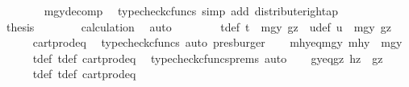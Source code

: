 \begin{isabellebody}
\ \ \ \ \ \ \isamarkupfalse%
\ mgy{\isacharunderscore}{\kern0pt}decomp\ \isamarkupfalse%
\ {\isacharparenleft}{\kern0pt}typecheck{\isacharunderscore}{\kern0pt}cfuncs{\isacharcomma}{\kern0pt}\ simp\ add{\isacharcolon}{\kern0pt}\ distribute{\isacharunderscore}{\kern0pt}right{\isacharunderscore}{\kern0pt}ap{\isacharparenright}{\kern0pt}\isanewline
\ \ \ \ \isamarkupfalse%
\ \isamarkupfalse%
\ {\isacharquery}{\kern0pt}thesis\isanewline
\ \ \ \ \ \ \isamarkupfalse%
\ calculation\ \isamarkupfalse%
\ auto\isanewline
\ \ \isamarkupfalse%
\isanewline
\ \ \isamarkupfalse%
\ \isamarkupfalse%
\ t{\isacharunderscore}{\kern0pt}def{}{\isacharcolon}{\kern0pt}\ {\isachardoublequoteopen}t\ {\isacharequal}{\kern0pt}\ {\isasymlangle}mgy{}{\isacharcomma}{\kern0pt}\ gz{\isasymrangle}{\isachardoublequoteclose}\ \ u{\isacharunderscore}{\kern0pt}def{\isacharcolon}{\kern0pt}\ {\isachardoublequoteopen}u\ {\isacharequal}{\kern0pt}\ {\isasymlangle}mgy{}{\isacharcomma}{\kern0pt}\ gz{\isasymrangle}{\isachardoublequoteclose}\isanewline
\ \ \ \ \isamarkupfalse%
\ cart{\isacharunderscore}{\kern0pt}prod{\isacharunderscore}{\kern0pt}eq{}\ \isamarkupfalse%
\ {\isacharparenleft}{\kern0pt}typecheck{\isacharunderscore}{\kern0pt}cfuncs{\isacharcomma}{\kern0pt}\ auto{\isacharcomma}{\kern0pt}\ presburger{\isacharparenright}{\kern0pt}\isanewline
\isanewline
\ \ \isamarkupfalse%
\ mhy{}{\isacharunderscore}{\kern0pt}eq{\isacharunderscore}{\kern0pt}mgy{}{\isacharcolon}{\kern0pt}\ {\isachardoublequoteopen}mhy{}\ {\isacharequal}{\kern0pt}\ mgy{}{\isachardoublequoteclose}\isanewline
\ \ \ \ \isamarkupfalse%
\ t{\isacharunderscore}{\kern0pt}def{}\ t{\isacharunderscore}{\kern0pt}def\ cart{\isacharunderscore}{\kern0pt}prod{\isacharunderscore}{\kern0pt}eq{}\ \isamarkupfalse%
\ {\isacharparenleft}{\kern0pt}typecheck{\isacharunderscore}{\kern0pt}cfuncs{\isacharunderscore}{\kern0pt}prems{\isacharcomma}{\kern0pt}\ auto{\isacharparenright}{\kern0pt}\isanewline
\ \ \isamarkupfalse%
\ gy{\isacharunderscore}{\kern0pt}eq{\isacharunderscore}{\kern0pt}gz{\isacharcolon}{\kern0pt}\ {\isachardoublequoteopen}hz\ {\isacharequal}{\kern0pt}\ gz{\isachardoublequoteclose}\isanewline
\ \ \ \ \isamarkupfalse%
\ t{\isacharunderscore}{\kern0pt}def{}\ t{\isacharunderscore}{\kern0pt}def\ cart{\isacharunderscore}{\kern0pt}prod{\isacharunderscore}{\kern0pt}eq{}\ \isamarkupfalse%

\end{isabellebody}
